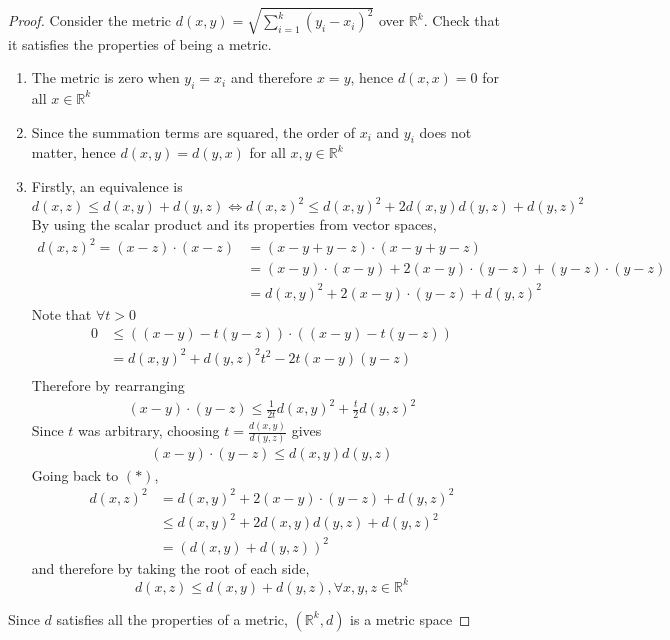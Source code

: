 \documentclass[../notes.tex]{subfiles}
\begin{document}
\begin{proof}
    Consider the metric $d(x,y) = \sqrt{\sum_{i=1}^k (y_i - x_i)^2}$ over $\mathbb{R}^k$. Check that it satisfies the properties of being a metric.
    \begin{enumerate}
        \item The metric is zero when $y_i = x_i$ and therefore $x = y$, hence $d(x,x) = 0$ for all $x \in \mathbb{R}^k$
        \item Since the summation terms are squared, the order of $x_i$ and $y_i$ does not matter, hence $d(x,y) = d(y,x)$ for all $x,y \in \mathbb{R}^k$
        \item 
        Firstly, an equivalence is
        \[
            d(x,z) \leq d(x,y) + d(y,z) \Leftrightarrow d(x,z)^2 \leq d(x,y)^2 + 2d(x,y)d(y,z) + d(y,z)^2
        \]
        By using the scalar product and its properties from vector spaces,
        \begin{align*}
            d(x,z)^2 = (x-z) \cdot (x-z) &= (x - y + y - z) \cdot (x - y + y -z) \\
            &= (x-y)\cdot (x-y) + 2 (x-y) \cdot (y - z) + (y-z)\cdot (y-z) \\
            &= d(x,y)^2 + 2 (x-y) \cdot (y - z) + d(y,z)^2 \tag{$*$}
        \end{align*}
        Note that $\forall t > 0$
        \begin{align*}
            0 &\leq ((x-y) - t(y-z)) \cdot ((x-y) - t(y-z)) \\
            &= d(x,y)^2 + d(y,z)^2 t^2 - 2t (x-y)(y-z) \\
        \end{align*}
        Therefore by rearranging
        \begin{align*}
            (x-y) \cdot (y-z) \leq \frac{1}{2t} d(x,y)^2 + \frac{t}{2} d(y,z)^2
        \end{align*}
        Since $t$ was arbitrary, choosing $t = \frac{d(x,y)}{d(y,z)}$ gives
        \begin{align*}
            (x-y) \cdot (y-z) \leq d(x,y) d(y,z) \tag{Cauchy Schwarz Inequality}
        \end{align*}
        Going back to $(*)$,
        \begin{align*}
            d(x,z)^2 &= d(x,y)^2 + 2 (x-y) \cdot (y - z) + d(y,z)^2 \\
                     &\leq d(x,y)^2 + 2d(x,y)d(y,z) + d(y,z)^2 \\
                     &= (d(x,y) + d(y,z))^2
        \end{align*}
        and therefore by taking the root of each side,
        \[
            d(x,z) \leq d(x,y) + d(y,z), \forall x,y,z \in \mathbb{R}^k
        \]
    \end{enumerate}
    Since $d$ satisfies all the properties of a metric, $(\mathbb{R}^k, d)$ is a metric space
\end{proof}
\end{document}
